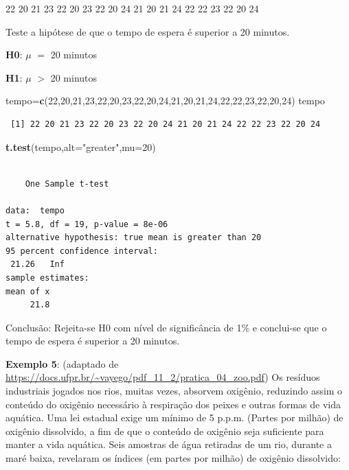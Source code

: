 \documentclass[12pt,brazil,oneside]{book}
\newenvironment{Shaded}{\begin{snugshade}}{\end{snugshade}}
\newcommand{\DataTypeTok}[1]{\textcolor[rgb]{0.13,0.29,0.53}{#1}}
\newcommand{\DecValTok}[1]{\textcolor[rgb]{0.00,0.00,0.81}{#1}}
\newcommand{\KeywordTok}[1]{\textcolor[rgb]{0.13,0.29,0.53}{\textbf{#1}}}
\newcommand{\NormalTok}[1]{#1}
\newcommand{\StringTok}[1]{\textcolor[rgb]{0.31,0.60,0.02}{#1}}
\begin{document}
22 20 21 23 22 20 23 22 20 24 21 20 21 24 22 22 23 22 20 24

Teste a hipótese de que o tempo de espera é superior a 20 minutos.

\textbf{H0}: \(\mu\) \(=\) 20 minutos

\textbf{H1}: \(\mu\) \(>\) 20 minutos

\begin{Shaded}
\begin{Highlighting}[]
\NormalTok{tempo=}\KeywordTok{c}\NormalTok{(}\DecValTok{22}\NormalTok{,}\DecValTok{20}\NormalTok{,}\DecValTok{21}\NormalTok{,}\DecValTok{23}\NormalTok{,}\DecValTok{22}\NormalTok{,}\DecValTok{20}\NormalTok{,}\DecValTok{23}\NormalTok{,}\DecValTok{22}\NormalTok{,}\DecValTok{20}\NormalTok{,}\DecValTok{24}\NormalTok{,}\DecValTok{21}\NormalTok{,}\DecValTok{20}\NormalTok{,}\DecValTok{21}\NormalTok{,}\DecValTok{24}\NormalTok{,}\DecValTok{22}\NormalTok{,}\DecValTok{22}\NormalTok{,}\DecValTok{23}\NormalTok{,}\DecValTok{22}\NormalTok{,}\DecValTok{20}\NormalTok{,}\DecValTok{24}\NormalTok{)}
\NormalTok{tempo}
\end{Highlighting}
\end{Shaded}

\begin{verbatim}
 [1] 22 20 21 23 22 20 23 22 20 24 21 20 21 24 22 22 23 22 20 24
\end{verbatim}

\begin{Shaded}
\begin{Highlighting}[]
\KeywordTok{t.test}\NormalTok{(tempo,}\DataTypeTok{alt=}\StringTok{"greater"}\NormalTok{,}\DataTypeTok{mu=}\DecValTok{20}\NormalTok{)}
\end{Highlighting}
\end{Shaded}

\begin{verbatim}

    One Sample t-test

data:  tempo
t = 5.8, df = 19, p-value = 8e-06
alternative hypothesis: true mean is greater than 20
95 percent confidence interval:
 21.26   Inf
sample estimates:
mean of x 
     21.8 
\end{verbatim}

Conclusão: Rejeita-se H0 com nível de significância de 1\% e conclui-se
que o tempo de espera é superior a 20 minutos.

\textbf{Exemplo 5}: (adaptado de
\url{https://docs.ufpr.br/~vayego/pdf_11_2/pratica_04_zoo.pdf}) Os
resíduos industriais jogados nos rios, muitas vezes, absorvem oxigênio,
reduzindo assim o conteúdo do oxigênio necessário à respiração dos
peixes e outras formas de vida aquática. Uma lei estadual exige um
mínimo de 5 p.p.m. (Partes por milhão) de oxigênio dissolvido, a fim de
que o conteúdo de oxigênio seja suficiente para manter a vida aquática.
Seis amostras de água retiradas de um rio, durante a maré baixa,
revelaram os índices (em partes por milhão) de oxigênio dissolvido:
\end{document}
